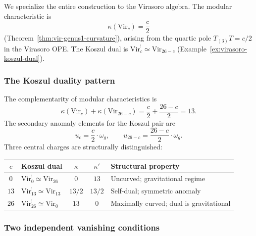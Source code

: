 We specialize the entire construction to the Virasoro algebra.
The modular characteristic is
\begin{equation}\label{eq:g9-kappa-vir}
\kappa(\mathrm{Vir}_c) = \frac{c}{2}
\end{equation}
(Theorem~\ref{thm:vir-genus1-curvature}), arising from the quartic
pole $T_{(3)}T = c/2$ in the Virasoro OPE. The Koszul dual is
$\mathrm{Vir}_c^! \simeq \mathrm{Vir}_{26-c}$
(Example~\ref{ex:virasoro-koszul-dual}).

\subsubsection{The Koszul duality pattern}
\label{subsubsec:koszul-pattern}

The complementarity of modular characteristics is
\begin{equation}\label{eq:g9-kappa-sum}
\kappa(\mathrm{Vir}_c) + \kappa(\mathrm{Vir}_{26-c})
= \frac{c}{2} + \frac{26-c}{2} = 13.
\end{equation}
The secondary anomaly elements for the Koszul pair are
\begin{equation}\label{eq:g9-u-pair}
u_c = \frac{c}{2} \cdot \omega_g,
\qquad
u_{26-c} = \frac{26-c}{2} \cdot \omega_g.
\end{equation}
Three central charges are structurally distinguished:

\begin{center}
\renewcommand{\arraystretch}{1.4}
\begin{tabular}{clccl}
\toprule
$c$ & Koszul dual & $\kappa$ & $\kappa'$ & Structural property \\
\midrule
$0$ & $\mathrm{Vir}_0^! \simeq \mathrm{Vir}_{26}$ & $0$ & $13$ &
 Uncurved; gravitational regime \\
$13$ & $\mathrm{Vir}_{13}^! \simeq \mathrm{Vir}_{13}$ & $13/2$ & $13/2$ &
 Self-dual; symmetric anomaly \\
$26$ & $\mathrm{Vir}_{26}^! \simeq \mathrm{Vir}_0$ & $13$ & $0$ &
 Maximally curved; dual is gravitational \\
\bottomrule
\end{tabular}
\end{center}

\subsubsection{Two independent vanishing conditions}
\label{subsubsec:complementarity-asymmetry}

